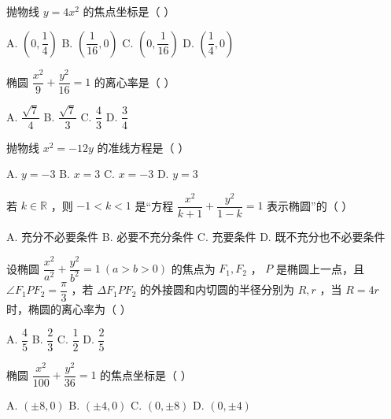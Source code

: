 \documentclass[11pt, a4paper]{article}
\begin{document}
\begin{baitap}[3]
抛物线 $y = 4x^2$ 的焦点坐标是（ ）
\par\vspace{3pt}
\noindent A. $(0, \dfrac{1}{4})$ \quad B. $(\dfrac{1}{16}, 0)$ \quad C. $(0, \dfrac{1}{16})$ \quad D. $(\dfrac{1}{4}, 0)$
\end{baitap}

\begin{baitap}[4]
椭圆 $\dfrac{x^2}{9} + \dfrac{y^2}{16} = 1$ 的离心率是（ ）
\par\vspace{3pt}
\noindent A. $\dfrac{\sqrt{7}}{4}$ \quad B. $\dfrac{\sqrt{7}}{3}$ \quad C. $\dfrac{4}{3}$ \quad D. $\dfrac{3}{4}$
\end{baitap}

\begin{baitap}[5]
抛物线 $x^2 = -12y$ 的准线方程是（ ）
\par\vspace{3pt}
\noindent A. $y = -3$ \quad B. $x = 3$ \quad C. $x = -3$ \quad D. $y = 3$
\end{baitap}

\begin{baitap}[6]
若 $k \in \mathbb{R}$ ，则 $-1 < k < 1$ 是“方程 $\dfrac{x^2}{k + 1} + \dfrac{y^2}{1 - k} = 1$ 表示椭圆”的（ ）
\par\vspace{3pt}
\noindent A. 充分不必要条件 \quad B. 必要不充分条件 \quad C. 充要条件 \quad D. 既不充分也不必要条件
\end{baitap}

\begin{baitap}[7]
设椭圆 $\dfrac{x^2}{a^2} + \dfrac{y^2}{b^2} = 1 \ (a > b > 0)$ 的焦点为 $F_1, F_2$ ， $P$ 是椭圆上一点，且 $\angle F_1 P F_2 = \dfrac{\pi}{3}$ ，若 $\Delta F_1 P F_2$ 的外接圆和内切圆的半径分别为 $R, r$ ，当 $R = 4r$ 时，椭圆的离心率为（ ）
\par\vspace{3pt}
\noindent A. $\dfrac{4}{5}$ \quad B. $\dfrac{2}{3}$ \quad C. $\dfrac{1}{2}$ \quad D. $\dfrac{2}{5}$
\end{baitap}

\begin{baitap}[8]
椭圆 $\dfrac{x^2}{100} + \dfrac{y^2}{36} = 1$ 的焦点坐标是（ ）
\par\vspace{3pt}
\noindent A. $(\pm 8, 0)$ \quad B. $(\pm 4, 0)$ \quad C. $(0, \pm 8)$ \quad D. $(0, \pm 4)$
\end{baitap}
\end{document}
